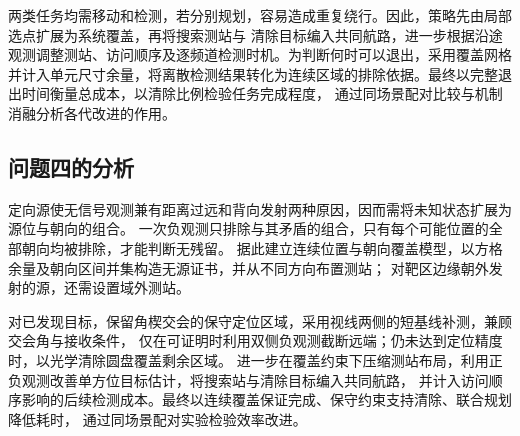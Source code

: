 两类任务均需移动和检测，若分别规划，容易造成重复绕行。因此，策略先由局部选点扩展为系统覆盖，再将搜索测站与
清除目标编入共同航路，进一步根据沿途观测调整测站、访问顺序及逐频道检测时机。为判断何时可以退出，采用覆盖网格
并计入单元尺寸余量，将离散检测结果转化为连续区域的排除依据。最终以完整退出时间衡量总成本，以清除比例检验任务完成程度，
通过同场景配对比较与机制消融分析各代改进的作用。

\subsection{问题四的分析}

定向源使无信号观测兼有距离过远和背向发射两种原因，因而需将未知状态扩展为源位与朝向的组合。
一次负观测只排除与其矛盾的组合，只有每个可能位置的全部朝向均被排除，才能判断无残留。
据此建立连续位置与朝向覆盖模型，以方格余量及朝向区间并集构造无源证书，并从不同方向布置测站；
对靶区边缘朝外发射的源，还需设置域外测站。

对已发现目标，保留角楔交会的保守定位区域，采用视线两侧的短基线补测，兼顾交会角与接收条件，
仅在可证明时利用双侧负观测截断远端；仍未达到定位精度时，以光学清除圆盘覆盖剩余区域。
进一步在覆盖约束下压缩测站布局，利用正负观测改善单方位目标估计，将搜索站与清除目标编入共同航路，
并计入访问顺序影响的后续检测成本。最终以连续覆盖保证完成、保守约束支持清除、联合规划降低耗时，
通过同场景配对实验检验效率改进。
